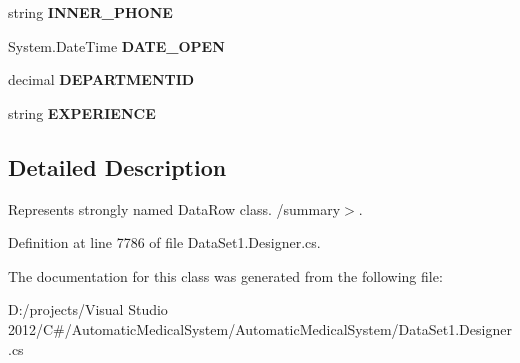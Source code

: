 \begin{CompactItemize}
\item 
string \textbf{INNER\_\-PHONE}\hspace{0.3cm}{\tt  [get, set]}\label{class_automatic_medical_system_1_1_data_set1_1_1_v_s_p_e_c_i_a_l_d_o_c_t_o_r_row_0b1ac8f744c046daf28fe4b453ec02f0}

\item 
System.DateTime \textbf{DATE\_\-OPEN}\hspace{0.3cm}{\tt  [get, set]}\label{class_automatic_medical_system_1_1_data_set1_1_1_v_s_p_e_c_i_a_l_d_o_c_t_o_r_row_80256d5d6a0bce2e60348e6dfaa6a40d}

\item 
decimal \textbf{DEPARTMENTID}\hspace{0.3cm}{\tt  [get, set]}\label{class_automatic_medical_system_1_1_data_set1_1_1_v_s_p_e_c_i_a_l_d_o_c_t_o_r_row_5da07ef3cb81dfed037d29abc9cd3a50}

\item 
string \textbf{EXPERIENCE}\hspace{0.3cm}{\tt  [get, set]}\label{class_automatic_medical_system_1_1_data_set1_1_1_v_s_p_e_c_i_a_l_d_o_c_t_o_r_row_6d3d88e8480ff72cf3d29ecaebc7fccd}

\end{CompactItemize}


\subsection{Detailed Description}
Represents strongly named DataRow class. /summary$>$. 

Definition at line 7786 of file DataSet1.Designer.cs.

The documentation for this class was generated from the following file:\begin{CompactItemize}
\item 
D:/projects/Visual Studio 2012/C\#/AutomaticMedicalSystem/AutomaticMedicalSystem/DataSet1.Designer.cs\end{CompactItemize}
